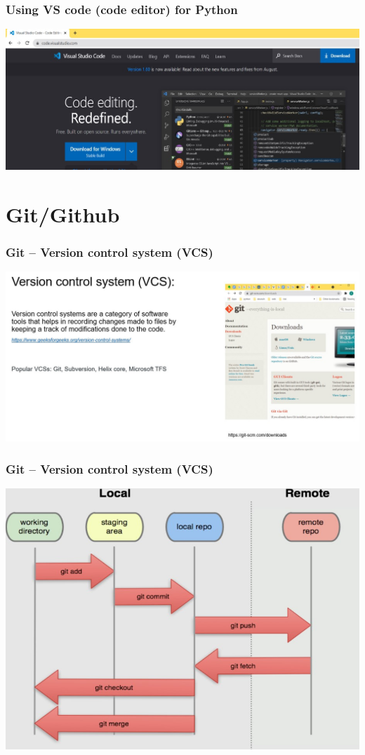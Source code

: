 \documentclass{beamer}
\begin{document}
\begin{frame}
    \frametitle{Using VS code (code editor) for Python}
    \centering
    \includegraphics[scale = 0.5]{figures/vscode.jpg}
\end{frame}

\section{Git/Github} 


\begin{frame}
    \frametitle{Git – Version control system (VCS)}
    \centering
    \includegraphics[scale = 0.35]{figures/git.jpg}
\end{frame}

\begin{frame}
    \frametitle{Git – Version control system (VCS)}
    \centering
    \includegraphics[scale = 0.5]{figures/git_flow.jpg}
\end{frame}
\end{document}
